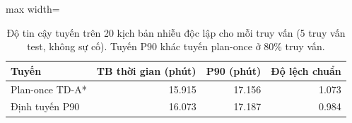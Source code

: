 \begin{table}[!htbp]
\centering
\small
\caption{Độ tin cậy tuyến trên 20 kịch bản nhiễu độc lập cho mỗi truy vấn (5 truy vấn test, không sự cố). Tuyến P90 khác tuyến plan-once ở 80\% truy vấn.}
\label{tab:tab_risk}
\begin{adjustbox}{max width=\linewidth}
\begin{tabular}{lrrr}
\toprule
Tuyến & TB thời gian (phút) & P90 (phút) & Độ lệch chuẩn \\
\midrule
Plan-once TD-A* & 15.915 & 17.156 & 1.073 \\
Định tuyến P90 & 16.073 & 17.187 & 0.984 \\
\bottomrule
\end{tabular}
\end{adjustbox}
\end{table}
